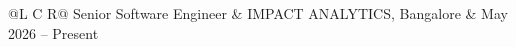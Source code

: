 
\noindent
\begin{tabularx}{\textwidth}{@{}L C R@{}}
\textcolor{role}{Senior Software Engineer} & \textcolor{company}{IMPACT ANALYTICS, Bangalore} & \textcolor{date}{May 2026 -- Present}\\
\end{tabularx}
\vspace{-1.6ex}

